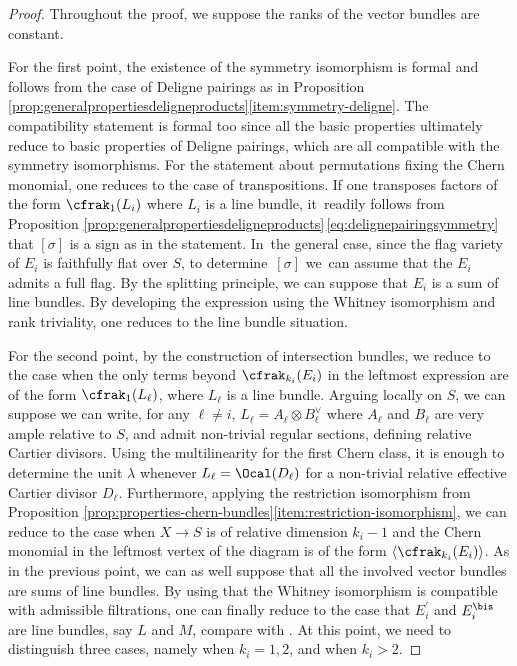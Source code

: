 \begin{proof}
Throughout the proof, we suppose the ranks of the vector bundles are constant.

For the first point, the existence of the symmetry isomorphism is formal and follows from the case of Deligne pairings as in Proposition \ref{prop:generalpropertiesdeligneproducts}\eqref{item:symmetry-deligne}. The compatibility statement is formal too since all the basic properties ultimately reduce to basic properties of Deligne pairings, which are all compatible with the symmetry isomorphisms. For the statement about permutations fixing the Chern monomial, one reduces to the case of transpositions. If one transposes factors of the form $\cfrak_1(L_{i})$ where $L_{i}$ is a line bundle, it~readily follows from Proposition \ref{prop:generalpropertiesdeligneproducts}\,\eqref{eq:delignepairingsymmetry} that $[\sigma]$ is a sign as in the statement. In~the general case, since the flag variety of $E_i$ is faithfully flat over $S$, to determine~$[\sigma]$ we~can assume that the $E_i$ admits a full flag. By the splitting principle, we can suppose that $E_i$ is a sum of line bundles. By developing the expression using the Whitney isomorphism and rank triviality, one reduces to the line bundle situation.

For the second point, by the construction of intersection bundles, we reduce to the case when the only terms beyond $\cfrak_{k_{i}}(E_i)$ in the leftmost expression are of the form $\cfrak_1(L_\ell)$, where $L_\ell$ is a line bundle. Arguing locally on $S$, we can suppose we can write, for any $\ell \neq i$, $L_\ell = A_\ell \otimes B_\ell^{\vee}$ where $A_\ell$ and $B_\ell$ are very ample relative to $S$, and admit non-trivial regular sections, defining relative Cartier divisors. Using the multilinearity for the first Chern class, it is enough to determine the unit $\lambda$ whenever $L_\ell = \Ocal(D_{\ell})$ for a non-trivial relative effective Cartier divisor $D_\ell$. Furthermore, applying the restriction isomorphism from Proposition \ref{prop:properties-chern-bundles}\eqref{item:restriction-isomorphism}, we can reduce to the case when $X\to S$ is of relative dimension $k_{i}-1$ and the Chern monomial in the leftmost vertex of the diagram is of the form $\langle \cfrak_{k_{i}}(E_i) \rangle$. As in the previous point, we can as well suppose that all the involved vector bundles are sums of line bundles. By using that the Whitney isomorphism is compatible with admissible filtrations, one can finally reduce to the case that $E_{i}^{\prime}$ and $E_{i}^{\bis}$ are line bundles, say $L$ and $M$, compare with \cite[Cor.\,2.20]{Eriksson-Freixas-Wentworth}. At this point, we need to distinguish three cases, namely when $k_i = 1, 2$, and when $k_i>2$.


\end{proof}
